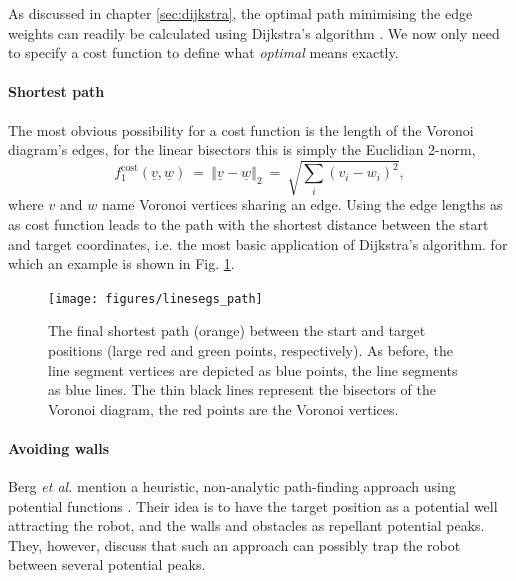 As discussed in chapter \ref{sec:dijkstra}, the optimal path minimising the edge weights 
can readily be calculated using Dijkstra's algorithm \cite{wiki_dijkstra}.
We now only need to specify a cost function to define what \textit{optimal} means exactly.

\paragraph{Shortest path}
The most obvious possibility for a cost function is the length of the Voronoi diagram's edges, 
for the linear bisectors this is simply the Euclidian 2-norm,
\begin{equation}
	f^{\mathrm{cost}}_1\left(\underline{v}, \underline{w} \right) \ = \ 
	\left\Vert \underline{v} - \underline{w} \right\Vert_2 \ =\ \sqrt{\sum_i \left(v_i - w_i\right)^2},
\end{equation}
where $v$ and $w$ name Voronoi vertices sharing an edge.
Using the edge lengths as as cost function leads to the path with the shortest distance 
between the start and target coordinates, i.e. the most basic application of Dijkstra's algorithm.
for which an example is shown in Fig. \ref{fig:linesegs_path}.

\begin{figure}[h]
	\begin{center}
		\texttt{[image: figures/linesegs\_path]}
	\end{center}
	\caption[Path between a start and a target position.]{
		The final shortest path (orange) between the start and target positions (large red and green points, respectively).
		As before, the line segment vertices are depicted as blue points, the line segments as blue lines.
		The thin black lines represent the bisectors of the Voronoi diagram, the red points are the Voronoi vertices.
		\label{fig:linesegs_path}}
\end{figure}


\paragraph{Avoiding walls}
Berg \textit{et al.} mention a heuristic, non-analytic path-finding approach using potential 
functions \cite[p. 305]{Berg2008}. Their idea is to have the target position as a potential well attracting
the robot, and the walls and obstacles as repellant potential peaks. They, however, discuss
that such an approach can possibly trap the robot between several potential peaks.

